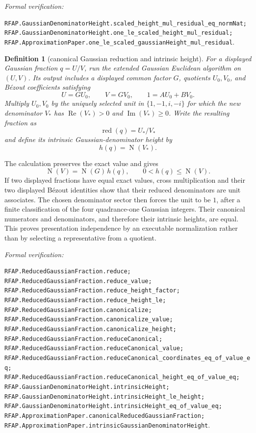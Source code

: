 \documentclass[11pt]{article}
\newtheorem{definition}[definition]{Definition}
\newcommand{\Norm}[1]{\operatorname{N}\!\left(#1\right)}
\newcommand{\Ree}{\operatorname{Re}}
\newcommand{\Imm}{\operatorname{Im}}
\newcommand{\leanref}[1]{\par\smallskip\noindent
  \emph{Formal verification:}\par\nobreak
  {\raggedright\nolinkurl{#1}.\par}}
\begin{document}
\leanref{RFAP.GaussianDenominatorHeight.scaled_height_mul_residual_eq_normNat;
RFAP.GaussianDenominatorHeight.one_le_scaled_height_mul_residual;
RFAP.ApproximationPaper.one_le_scaled_gaussianHeight_mul_residual}

\begin{definition}[canonical Gaussian reduction and intrinsic height]
\label{def:intrinsic-gaussian-height}
For a displayed Gaussian fraction $q=U/V$, run the extended Gaussian
Euclidean algorithm on $(U,V)$.  Its output includes a displayed common
factor $G$, quotients $U_0,V_0$, and B\'ezout coefficients satisfying
\[
 U=GU_0,\qquad V=GV_0,\qquad 1=A U_0+B V_0.
\]
Multiply $U_0,V_0$ by the uniquely selected unit in
$\{1,-1,i,-i\}$ for which the new denominator $V_*$ has
$\Ree(V_*)>0$ and $\Imm(V_*)\ge0$.  Write the resulting fraction as
\[
                 \operatorname{red}(q)=U_*/V_*
\]
and define its \emph{intrinsic Gaussian-denominator height} by
\[
                              h(q)=\Norm{V_*}.
\]
\end{definition}

The calculation preserves the exact value and gives
\[
       \Norm V=\Norm G\,h(q),\qquad 0<h(q)\le\Norm V.
\]
If two displayed fractions have equal exact values, cross multiplication and
their two displayed B\'ezout identities show that their reduced denominators
are unit associates.  The chosen denominator sector then forces the unit to
be $1$, after a finite classification of the four quadrance-one Gaussian
integers.  Their canonical numerators and denominators, and therefore their
intrinsic heights, are equal.  This proves presentation independence by an
executable normalization rather than by selecting a representative from a
quotient.

\leanref{RFAP.ReducedGaussianFraction.reduce;
RFAP.ReducedGaussianFraction.reduce_value;
RFAP.ReducedGaussianFraction.reduce_height_factor;
RFAP.ReducedGaussianFraction.reduce_height_le;
RFAP.ReducedGaussianFraction.canonicalize;
RFAP.ReducedGaussianFraction.canonicalize_value;
RFAP.ReducedGaussianFraction.canonicalize_height;
RFAP.ReducedGaussianFraction.reduceCanonical;
RFAP.ReducedGaussianFraction.reduceCanonical_value;
RFAP.ReducedGaussianFraction.reduceCanonical_coordinates_eq_of_value_eq;
RFAP.ReducedGaussianFraction.reduceCanonical_height_eq_of_value_eq;
RFAP.GaussianDenominatorHeight.intrinsicHeight;
RFAP.GaussianDenominatorHeight.intrinsicHeight_le_height;
RFAP.GaussianDenominatorHeight.intrinsicHeight_eq_of_value_eq;
RFAP.ApproximationPaper.canonicalReducedGaussianFraction;
RFAP.ApproximationPaper.intrinsicGaussianDenominatorHeight}
\end{document}
